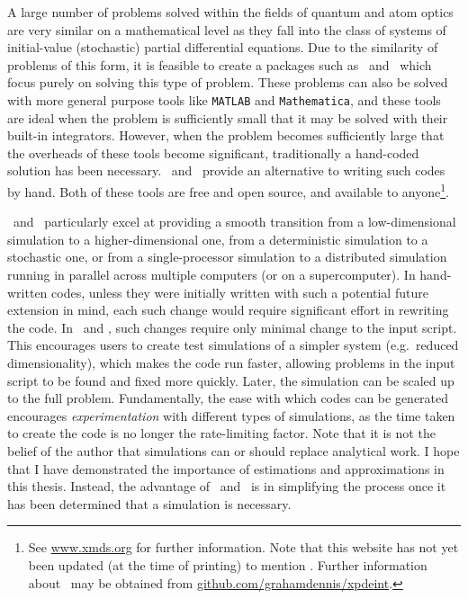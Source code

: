 A large number of problems solved within the fields of quantum and atom optics are very similar on a mathematical level as they fall into the class of systems of initial-value (stochastic) partial differential equations.  Due to the similarity of problems of this form, it is feasible to create a packages such as \XMDS\ and \xpdeint\ which focus purely on solving this type of problem.  These problems can also be solved with more general purpose tools like \texttt{MATLAB} and \texttt{Mathematica}, and these tools are ideal when the problem is sufficiently small that it may be solved with their built-in integrators.  However, when the problem becomes sufficiently large that the overheads of these tools become significant, traditionally a hand-coded solution has been necessary.  \XMDS\ and \xpdeint\ provide an alternative to writing such codes by hand.  Both of these tools are free and open source, and available to anyone\footnote{See \url{www.xmds.org} for further information.  Note that this website has not yet been updated (at the time of printing) to mention \xpdeint.  Further information about \xpdeint\ may be obtained from \url{github.com/grahamdennis/xpdeint}.}.

\XMDS\ and \xpdeint\ particularly excel at providing a smooth transition from a low-dimensional simulation to a higher-dimensional one, from a deterministic simulation to a stochastic one, or from a single-processor simulation to a distributed simulation running in parallel across multiple computers (or on a supercomputer).  In hand-written codes, unless they were initially written with such a potential future extension in mind, each such change would require significant effort in rewriting the code.  In \XMDS\ and \xpdeint, such changes require only minimal change to the input script.  This encourages users to create test simulations of a simpler system (e.g.\ reduced dimensionality), which makes the code run faster, allowing problems in the input script to be found and fixed more quickly.  Later, the simulation can be scaled up to the full problem.  Fundamentally, the ease with which codes can be generated encourages \emph{experimentation} with different types of simulations, as the time taken to create the code is no longer the rate-limiting factor.  Note that it is not the belief of the author that simulations can or should replace analytical work.  I hope that I have demonstrated the importance of estimations and approximations in this thesis.  Instead, the advantage of \XMDS\ and \xpdeint\ is in simplifying the process once it has been determined that a simulation is necessary.

